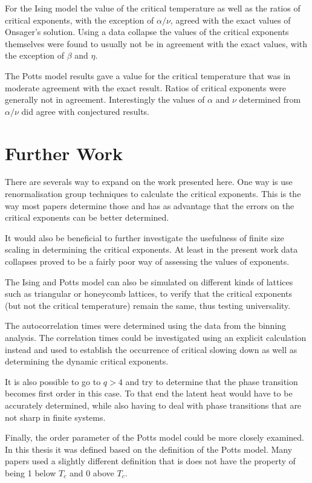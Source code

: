\documentclass[11pt, a4paper]{report} %
\begin{document}
For the Ising model the value of the critical temperature as well as the ratios of critical exponents, with the exception of \(\alpha/\nu\), agreed with the exact values of Onsager's solution.
Using a data collapse the values of the critical exponents themselves were found to usually not be in agreement with the exact values, with the exception of \(\beta\) and \(\eta\).

The Potts model results gave a value for the critical temperature that was in moderate agreement with the exact result.
Ratios of critical exponents were generally not in agreement.
Interestingly the values of \(\alpha\) and \(\nu\) determined from \(\alpha /\nu\) did agree with conjectured results.


\section{Further Work}
There are severals way to expand on the work presented here.
One way is use renormalisation group techniques to calculate the critical exponents.
This is the way most papers determine those and has as advantage that the errors on the critical exponents can be better determined.

It would also be beneficial to further investigate the usefulness of finite size scaling in determining the critical exponents.
At least in the present work data collapses proved to be a fairly poor way of assessing the values of exponents.

The Ising and Potts model can also be simulated on different kinds of lattices such as triangular or honeycomb lattices, to verify that the critical exponents (but not the critical temperature) remain the same, thus testing universality.

The autocorrelation times were determined using the data from the binning analysis.
The correlation times could be investigated using an explicit calculation instead and used to establish the occurrence of critical slowing down as well as determining the dynamic critical exponents.

It is also possible to go to \(q > 4\) and try to determine that the phase transition becomes first order in this case.
To that end the latent heat would have to be accurately determined, while also having to deal with phase transitions that are not sharp in finite systems.

Finally, the order parameter of the Potts model could be more closely examined.
In this thesis it was defined based on the definition of the Potts model.
Many papers used a slightly different definition that is does not have the property of being 1 below \(T_c\) and 0 above \(T_c\).\cite{binder:1981a,wu:1982,fan:2007}





\end{document}
